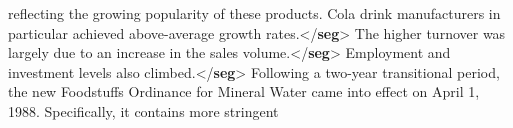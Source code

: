 \begin{shaded}
\hspace*{1em}\hspace*{1em}\hspace*{1em}\hspace*{1em} reflecting the growing popularity of these products. Cola\mbox{}\newline 
\hspace*{1em}\hspace*{1em}\hspace*{1em}\hspace*{1em} drink manufacturers in particular achieved above-average\mbox{}\newline 
\hspace*{1em}\hspace*{1em}\hspace*{1em}\hspace*{1em} growth rates.{</\textbf{seg}>}\mbox{}\newline 
\hspace*{1em}The higher turnover was largely due to an\mbox{}\newline 
\hspace*{1em}\hspace*{1em}\hspace*{1em}\hspace*{1em} increase in the sales volume.{</\textbf{seg}>}\mbox{}\newline 
\hspace*{1em}Employment and investment levels also climbed.{</\textbf{seg}>}\mbox{}\newline 
\hspace*{1em}Following a two-year transitional period, the new\mbox{}\newline 
\hspace*{1em}\hspace*{1em}\hspace*{1em}\hspace*{1em} Foodstuffs Ordinance for Mineral Water came into effect on\mbox{}\newline 
\hspace*{1em}\hspace*{1em}\hspace*{1em}\hspace*{1em} April 1, 1988. Specifically, it contains more stringent\mbox{}\newline 

\end{shaded}
